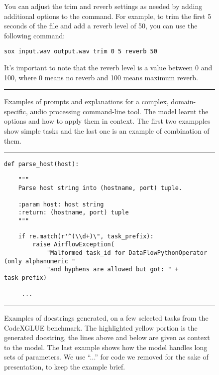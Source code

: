 \documentclass[10pt]{article}
\begin{document}
\begin{figure}
You can adjust the trim and reverb settings as needed by adding additional options to the command. For example, to trim the first 5 seconds of the file and add a reverb level of 50, you can use the following command:
\begin{verbatim}
sox input.wav output.wav trim 0 5 reverb 50
\end{verbatim}
It's important to note that the reverb level is a value between 0 and 100, where 0 means no reverb and 100 means maximum reverb.\\
\noindent\rule{\textwidth}{1pt}
    \caption{Examples of prompts and explanations for a complex, domain-specific, audio processing command-line tool. The model learnt the options and how to apply them in context. The first two exampples show simple tasks and the last one is an example of combination of them.}
    \label{fig:sox_examples}
\end{figure}


{


\begin{figure}
\noindent\rule{\textwidth}{1pt}
\begin{verbatim}
def parse_host(host):
\end{verbatim}
\vspace{-0.5cm}
\begin{verbatim}
    """
    Parse host string into (hostname, port) tuple.
    
    :param host: host string
    :return: (hostname, port) tuple
    """
\end{verbatim}
\vspace{-0.8cm}
\begin{verbatim}
    if re.match(r'^(\\d+)\", task_prefix):
        raise AirflowException(
            "Malformed task_id for DataFlowPythonOperator (only alphanumeric "
            "and hyphens are allowed but got: " + task_prefix)

     ...
\end{verbatim}
\vspace{-0.5cm}           
     
\noindent\rule{\textwidth}{1pt}
\caption{Examples of docstrings generated, on a few selected tasks from the CodeXGLUE benchmark. The highlighted yellow portion is the generated docstring, the lines above and below are given as context to the model. The last example shows how the model handles long sets of parameters. We use ``...'' for code we removed for the sake of presentation, to keep the example brief.}
    \label{fig:examples_infilling_codexglue}
\end{figure}

}
\end{document}
